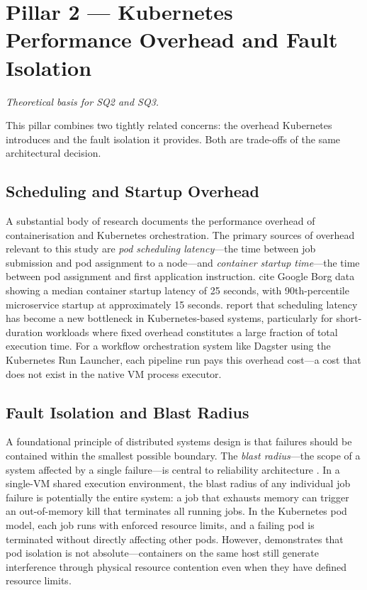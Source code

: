 
\section{Pillar 2 --- Kubernetes Performance Overhead and Fault Isolation}
\label{sec:pillar2}

\emph{Theoretical basis for SQ2 and SQ3.}

This pillar combines two tightly related concerns: the overhead Kubernetes introduces and the fault isolation it provides. Both are trade-offs of the same architectural decision.

\subsection{Scheduling and Startup Overhead}
\label{subsec:scheduling-overhead}

A substantial body of research documents the performance overhead of containerisation and Kubernetes orchestration. The primary sources of overhead relevant to this study are \emph{pod scheduling latency}---the time between job submission and pod assignment to a node---and \emph{container startup time}---the time between pod assignment and first application instruction. \citet{choi2021} cite Google Borg data showing a median container startup latency of 25 seconds, with 90th-percentile microservice startup at approximately 15 seconds. \citet{liu2024} report that scheduling latency has become a new bottleneck in Kubernetes-based systems, particularly for short-duration workloads where fixed overhead constitutes a large fraction of total execution time. For a workflow orchestration system like Dagster using the Kubernetes Run Launcher, each pipeline run pays this overhead cost---a cost that does not exist in the native VM process executor.

\subsection{Fault Isolation and Blast Radius}
\label{subsec:fault-isolation}

A foundational principle of distributed systems design is that failures should be contained within the smallest possible boundary. The \emph{blast radius}---the scope of a system affected by a single failure---is central to reliability architecture \citep{cilic2023}. In a single-VM shared execution environment, the blast radius of any individual job failure is potentially the entire system: a job that exhausts memory can trigger an out-of-memory kill that terminates all running jobs. In the Kubernetes pod model, each job runs with enforced resource limits, and a failing pod is terminated without directly affecting other pods. However, \citet{casalicchio2019} demonstrates that pod isolation is not absolute---containers on the same host still generate interference through physical resource contention even when they have defined resource limits.

